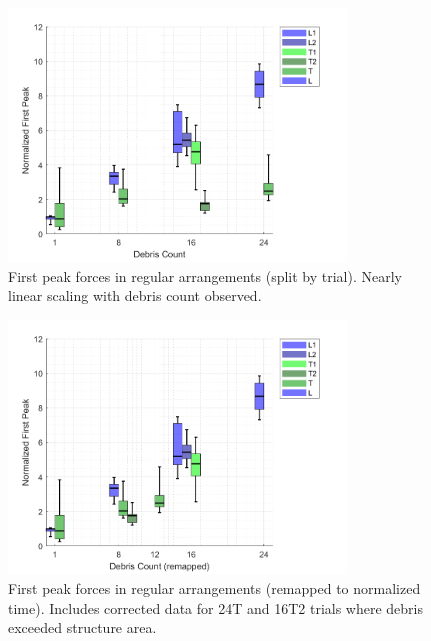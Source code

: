 \documentclass{article}
\begin{document}
\begin{figure}[htbp]
    \centering
    \includegraphics[width=0.8\textwidth]{FirstPeak_Regular_SplitByTrial.png}
    \caption{First peak forces in regular arrangements (split by trial). Nearly linear scaling with debris count observed.}
    \label{fig:firstpeak_regular_split}
\end{figure}

\begin{figure}[htbp]
    \centering
    \includegraphics[width=0.8\textwidth]{FirstPeak_Regular_RemappedT.png}
    \caption{First peak forces in regular arrangements (remapped to normalized time). Includes corrected data for 24T and 16T2 trials where debris exceeded structure area.}
    \label{fig:firstpeak_regular_remap}
\end{figure}
\end{document}
